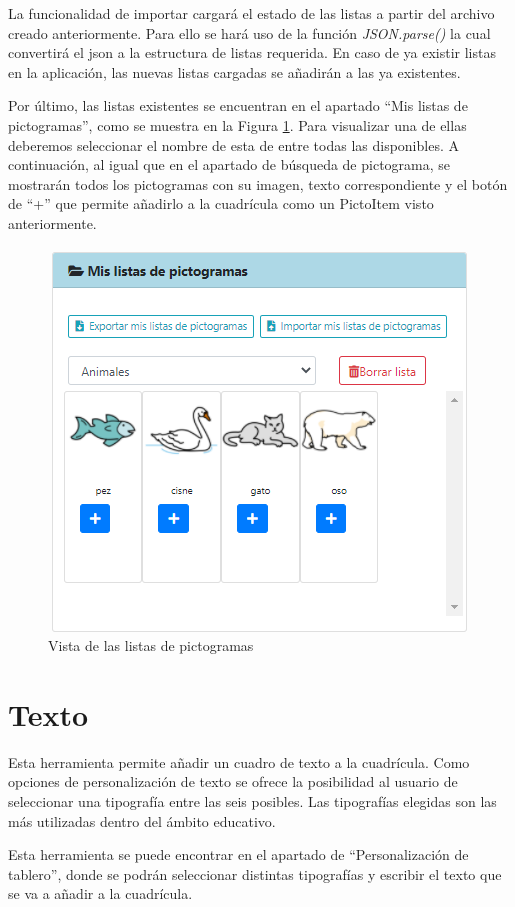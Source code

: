 La funcionalidad de importar cargará el estado de las listas a partir del archivo creado anteriormente. Para ello se hará uso de la función \textit{JSON.parse()} la cual convertirá el json a la estructura de listas requerida. En caso de ya existir listas en la aplicación, las nuevas listas cargadas se añadirán a las ya existentes. 

Por último, las listas existentes se encuentran en el apartado “Mis listas de pictogramas”, como se muestra en la Figura \ref{fig:lisapictosel}. Para visualizar una de ellas deberemos seleccionar el nombre de esta de entre todas las disponibles. A continuación, al igual que en el apartado de búsqueda de pictograma, se mostrarán todos los pictogramas con su imagen, texto correspondiente y el botón de “+” que permite añadirlo a la cuadrícula como un PictoItem visto anteriormente.

\begin{figure}[h!]
	\centering
	\includegraphics[width=0.7\linewidth]{Imagenes/Bitmap/lisaPictoSel}
	\caption{Vista de las listas de pictogramas}
	\label{fig:lisapictosel}
\end{figure}


\section{Texto}

Esta herramienta permite añadir un cuadro de texto a la cuadrícula. Como opciones de personalización de texto se ofrece la posibilidad al usuario de seleccionar una tipografía entre las seis posibles. Las tipografías elegidas son las más utilizadas dentro del ámbito educativo.

Esta herramienta se puede encontrar en el apartado de “Personalización de tablero”, donde se podrán seleccionar distintas tipografías y escribir el texto que se va a añadir a la cuadrícula.

